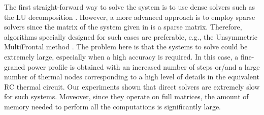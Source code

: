The first straight-forward way to solve the system is to use dense solvers such as the LU decomposition \cite{press2007}. However, a more advanced approach is to employ sparse solvers since the matrix of the system given in  is a sparse matrix. Therefore, algorithms specially designed for such cases are preferable, e.g., the Unsymmetric MultiFrontal method \cite{umfpack2004}. The problem here is that the systems to solve could be extremely large, especially when a high accuracy is required. In this case, a fine-graned power profile is obtained with an increased number of steps or/and a large number of thermal nodes corresponding to a high level of details in the equivalent RC thermal circuit. Our experiments shown that direct solvers are extremely slow for such systems. Moveover, since they operate on full matrices, the amount of memory needed to perform all the computations is significantly large.

